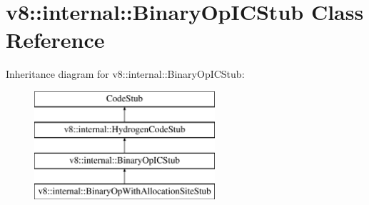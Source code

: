 \hypertarget{classv8_1_1internal_1_1_binary_op_i_c_stub}{}\section{v8\+:\+:internal\+:\+:Binary\+Op\+I\+C\+Stub Class Reference}
\label{classv8_1_1internal_1_1_binary_op_i_c_stub}
Inheritance diagram for v8\+:\+:internal\+:\+:Binary\+Op\+I\+C\+Stub\+:\begin{figure}[H]
\begin{center}
\leavevmode
\includegraphics[height=4.000000cm]{classv8_1_1internal_1_1_binary_op_i_c_stub}
\end{center}
\end{figure}
